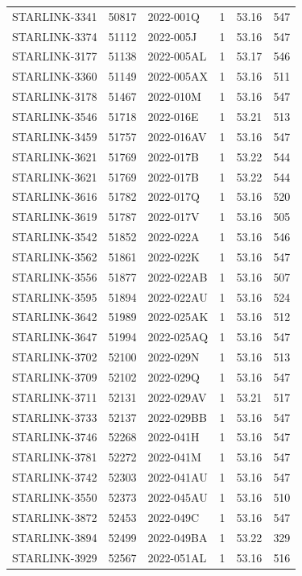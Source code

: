 \begin{longtable}{lllccc}
STARLINK-3341 & 50817 & 2022-001Q & 1 & 53.16 & 547 \\
STARLINK-3374 & 51112 & 2022-005J & 1 & 53.16 & 547 \\
STARLINK-3177 & 51138 & 2022-005AL & 1 & 53.17 & 546 \\
STARLINK-3360 & 51149 & 2022-005AX & 1 & 53.16 & 511 \\
STARLINK-3178 & 51467 & 2022-010M & 1 & 53.16 & 547 \\
STARLINK-3546 & 51718 & 2022-016E & 1 & 53.21 & 513 \\
STARLINK-3459 & 51757 & 2022-016AV & 1 & 53.16 & 547 \\
STARLINK-3621 & 51769 & 2022-017B & 1 & 53.22 & 544 \\
STARLINK-3621 & 51769 & 2022-017B & 1 & 53.22 & 544 \\
STARLINK-3616 & 51782 & 2022-017Q & 1 & 53.16 & 520 \\
STARLINK-3619 & 51787 & 2022-017V & 1 & 53.16 & 505 \\
STARLINK-3542 & 51852 & 2022-022A & 1 & 53.16 & 546 \\
STARLINK-3562 & 51861 & 2022-022K & 1 & 53.16 & 547 \\
STARLINK-3556 & 51877 & 2022-022AB & 1 & 53.16 & 507 \\
STARLINK-3595 & 51894 & 2022-022AU & 1 & 53.16 & 524 \\
STARLINK-3642 & 51989 & 2022-025AK & 1 & 53.16 & 512 \\
STARLINK-3647 & 51994 & 2022-025AQ & 1 & 53.16 & 547 \\
STARLINK-3702 & 52100 & 2022-029N & 1 & 53.16 & 513 \\
STARLINK-3709 & 52102 & 2022-029Q & 1 & 53.16 & 547 \\
STARLINK-3711 & 52131 & 2022-029AV & 1 & 53.21 & 517 \\
STARLINK-3733 & 52137 & 2022-029BB & 1 & 53.16 & 547 \\
STARLINK-3746 & 52268 & 2022-041H & 1 & 53.16 & 547 \\
STARLINK-3781 & 52272 & 2022-041M & 1 & 53.16 & 547 \\
STARLINK-3742 & 52303 & 2022-041AU & 1 & 53.16 & 547 \\
STARLINK-3550 & 52373 & 2022-045AU & 1 & 53.16 & 510 \\
STARLINK-3872 & 52453 & 2022-049C & 1 & 53.16 & 547 \\
STARLINK-3894 & 52499 & 2022-049BA & 1 & 53.22 & 329 \\
STARLINK-3929 & 52567 & 2022-051AL & 1 & 53.16 & 516 \\

\end{longtable}
